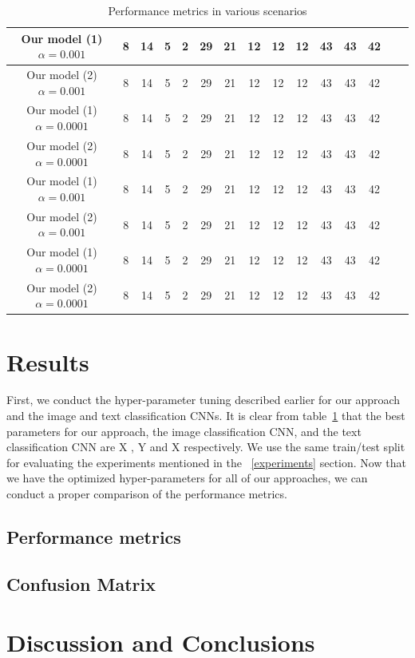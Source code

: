 \documentclass{article} %
\begin{document}
\begin{table}
{\begin{tabular}{|c|c|c|c|c|c|c|c|c|c|c|c|c|c|c|}
    \hline
            Our model (1) $\alpha =0.001$ &8&14&5&2&29&21&12&12&12&43&43&42\\
    \hline
            Our model (2)  $\alpha =0.001$&8&14&5&2&29&21&12&12&12&43&43&42\\
    \hline
            Our model (1)   $\alpha =0.0001$&8&14&5&2&29&21&12&12&12&43&43&42\\
    \hline
            Our model (2)    $\alpha =0.0001$&8&14&5&2&29&21&12&12&12&43&43&42\\
    \hline
            Our model (1) $\alpha =0.001$ &8&14&5&2&29&21&12&12&12&43&43&42\\
    \hline
            Our model (2)  $\alpha =0.001$&8&14&5&2&29&21&12&12&12&43&43&42\\
    \hline
            Our model (1)   $\alpha =0.0001$&8&14&5&2&29&21&12&12&12&43&43&42\\
    \hline
            Our model (2)    $\alpha =0.0001$&8&14&5&2&29&21&12&12&12&43&43&42\\
    \hline
  \end{tabular}
  }
  \caption{Performance metrics in various scenarios}
  \label{tab:hyperparam}
\end{table}

\section{Results}
First, we conduct the hyper-parameter tuning described earlier for our approach and the image and text classification CNNs. It is clear from table~\ref{tab:hyperparam} that 
the best parameters for our approach, the image classification CNN, and the text classification CNN are X , Y and X respectively. We use the same train/test split for evaluating the experiments mentioned in the ~\ref{experiments} section. Now that we have the optimized hyper-parameters for all of our approaches, we can conduct a proper comparison of the performance metrics.
\subsection{Performance metrics}

\subsection{Confusion Matrix}






\section{Discussion and Conclusions}
\end{document}
